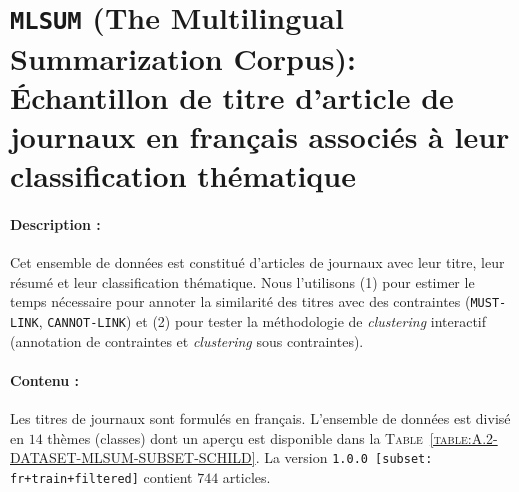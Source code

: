 	\section[Jeu de données \texttt{MLSUM}]{\texttt{MLSUM} (The Multilingual Summarization Corpus): Échantillon de titre d'article de journaux en français associés à leur classification thématique}
	\label{annex:A.2-DATASET-MLSUM-SUBSET-SCHILD}
		
		
		\paragraph{Description :}
		Cet ensemble de données est constitué d'articles de journaux avec leur titre, leur résumé et leur classification thématique.
		Nous l'utilisons (1) pour estimer le temps nécessaire pour annoter la similarité des titres avec des contraintes (\texttt{MUST-LINK}, \texttt{CANNOT-LINK}) et (2) pour tester la méthodologie de \textit{clustering} interactif (annotation de contraintes et \textit{clustering} sous contraintes).
		
		\paragraph{Contenu :}
		Les titres de journaux sont formulés en français.
		L'ensemble de données est divisé en $14$ thèmes (classes) dont un aperçu est disponible dans la \textsc{Table~\ref{table:A.2-DATASET-MLSUM-SUBSET-SCHILD}}.
		La version \texttt{1.0.0 [subset: fr+train+filtered]} contient $744$ articles.
		
